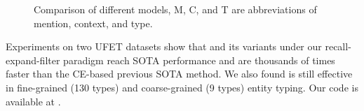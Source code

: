 \begin{figure}[t]
    \centering
    \caption{Comparison of different models, M, C, and T are abbreviations of mention, context, and type.}
    \label{fig:adv}
\end{figure}

Experiments on two UFET datasets show that {\bf \textsc{\name}} and its variants under our recall-expand-filter paradigm reach SOTA performance and are thousands of times faster than the CE-based previous SOTA method. We also found {\bf \textsc{\name}} is still effective in fine-grained (130 types) and coarse-grained (9 types) entity typing. Our code is available at \code.
